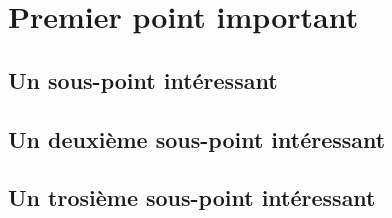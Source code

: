 \chapter{Premier point important}

\section{Un sous-point intéressant}

\section{Un deuxième sous-point intéressant}

\section{Un trosième sous-point intéressant}